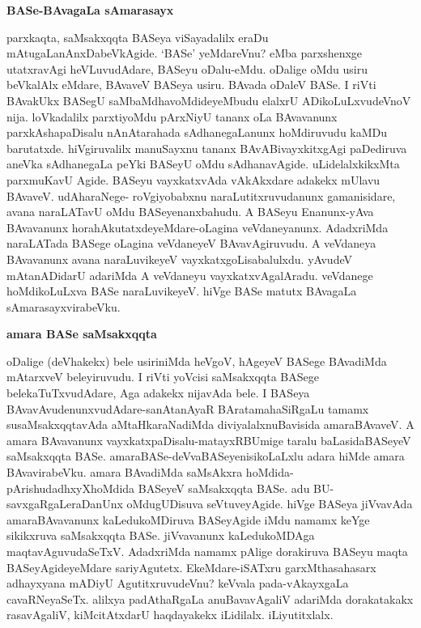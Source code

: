 {\bigskip
\noindent
{\large\bf BASe-BAvagaLa sAmarasayx}}\label{page24}
\medskip

\noindent
parxkaqta, saMsakxqqta BASeya viSayadalilx eraDu mAtugaLanAnxDabeVkAgide. `BASe' yeMdareVnu? eMba parxshenxge utatxravAgi heVLuvudAdare, BASeyu oDalu-eMdu. oDalige oMdu usiru beVkalAlx \-eMdare, BAvaveV BASeya usiru. BAvada oDaleV BASe. I riVti BAvakUkx BASegU saMbaMdha\-voMdide\-yeMbudu elalxrU ADikoLuLxvudeVnoV nija. loVkadalilx parxtiyoMdu pArxNiyU tananx oLa BAva\-vanunx parxkAshapaDisalu nAnAtarahada sAdhanegaLanunx hoMdiruvudu kaMDu baru\-tatxde. hiVgiruvalilx manu\-Sayxnu tananx BAvABivayxkitxgAgi paDediruva aneVka sAdhane\-gaLa peYki BASeyU oMdu sAdhanavAgide. uLi\-delalx\-kikxMta parxmuKavU Agide. BASeyu vayxkatxvAda vAkAkxdare adakekx mUlavu BAvaveV. udA\-hara\-Nege- roVgi\-yobabxnu naraLutitxruvudanunx gamanisidare, avana nara\-LATavU oMdu BASeyenanx\-bahudu. A BASeyu Enanunx-yAva BAvavanunx horahAkutatxdeyeMdare-\-oLa\-gina veVdaneyanunx. AdadxriMda nara\-LATada BASege oLagina veVdaneyeV BAva\break\-vAgiru\-vudu. A veVdaneya BAvavanunx avana naraLu\-vikeyeV vayxkatxgoLisabalulxdu. yAvudeV mAtanADidarU adariMda A veVdaneyu vayxkatxvAgalAradu. veVda\-nege hoMdikoLuLxva BASe naraLuvikeyeV. hiVge BASe matutx BAvagaLa sAma\-rasayxvirabeVku.

{\medskip
\noindent
{\large\bf amara BASe saMsakxqqta}}
\medskip

\noindent
oDalige (deVhakekx) bele usiriniMda heVgoV, hAgeyeV BASege BAvadiMda mAtarxveV beleyiru\-vudu. I riVti yoVcisi saMsakxqqta BASege belekaTuTxvudAdare, Aga adakekx nijavAda bele. I BASeya BAva\-vAvu\-denunxvu\-dAdare-sanAtanAyaR BArata\-mahaSiRgaLu tamamx susaMsakxqqtavAda aMtaHkaraNadiMda divi\-yalalxnu\-Bavisida amara\-BAvaveV. A amara BAvavanunx vayxkatxpaDisalu-matayxRBUmige taralu baLa\-sida\break BASeyeV saMsakxqqta BASe. amaraBASe-deVvaBASeyenisikoLaLxlu adara hiMde amara BAvavira\-beVku. amara BAvadiMda saMsAkxra hoMdida-pArishudadhxyX\break hoMdida BASeyeV saMsakxqqta BASe. adu BU-savxgaR\-gaLera\-DanUnx oMdugUDi\-suva seVtuveyAgide. hiVge BASeya jiVvavAda amaraBAvavanunx kaLedu\-koMDi\-ruva BASeyAgide iMdu namamx keYge sikikxruva saMsakxqqta BASe. jiVvavanunx kaLedu\-koMDAga maqta\-vAguvu\-daSeTxV. AdadxriMda namamx pAlige dorakiruva BASeyu maqta BASeyAgideyeMdare sari\-yAgutetx. EkeMdare-iSATxru garxMthasahasarx adhayxyana mADiyU AgutitxruvudeVnu? keVvala pada-vAkayx\-gaLa cavaRNe\-yaSeTx. alilxya padAthaRgaLa anuBavavAgaliV adariMda dorakatakakx rasavAgaliV, kiMci\-tAtxdarU haqda\-yakekx iLidilalx. iLiyutitxlalx. 

